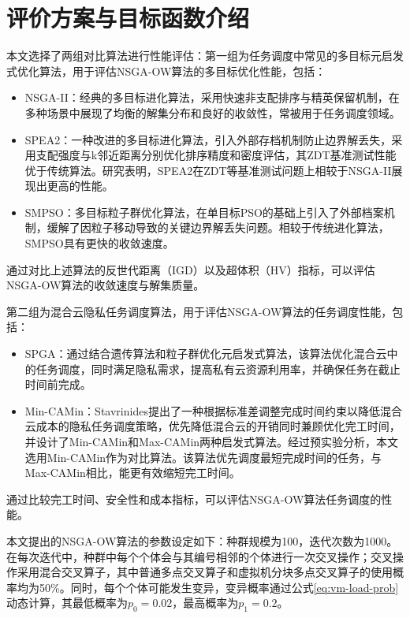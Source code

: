 \section{评价方案与目标函数介绍}

本文选择了两组对比算法进行性能评估：第一组为任务调度中常见的多目标元启发式优化算法，用于评估NSGA-OW算法的多目标优化性能，包括：
\begin{itemize}
    \item NSGA-II\cite{debFastElitistMultiobjective2002}：经典的多目标进化算法，采用快速非支配排序与精英保留机制，在多种场景中展现了均衡的解集分布和良好的收敛性，常被用于任务调度领域\cite{jafariJointOptimizationEnergy2023}。
    \item SPEA2\cite{daghayeghiDelayAwareEnergyEfficientTask2024}：一种改进的多目标进化算法，引入外部存档机制防止边界解丢失，采用支配强度与k邻近距离分别优化排序精度和密度评估，其ZDT基准测试性能优于传统算法。研究表明，SPEA2在ZDT等基准测试问题上相较于NSGA-II展现出更高的性能。
    \item SMPSO\cite{saifWorkloadAllocationEnergy2023}：多目标粒子群优化算法，在单目标PSO的基础上引入了外部档案机制，缓解了因粒子移动导致的关键边界解丢失问题。相较于传统进化算法，SMPSO具有更快的收敛速度。
\end{itemize}

通过对比上述算法的反世代距离（IGD）以及超体积（HV）指标，可以评估NSGA-OW算法的收敛速度与解集质量。

第二组为混合云隐私任务调度算法，用于评估NSGA-OW算法的任务调度性能，包括：
\begin{itemize}
    \item SPGA\cite{huangImprovedGeneticAlgorithm2023}：通过结合遗传算法和粒子群优化元启发式算法，该算法优化混合云中的任务调度，同时满足隐私需求，提高私有云资源利用率，并确保任务在截止时间前完成。
    \item Min-CAMin\cite{stavrinidesDynamicSchedulingBagsoftasks2021}：Stavrinides提出了一种根据标准差调整完成时间约束以降低混合云成本的隐私任务调度策略，优先降低混合云的开销同时兼顾优化完工时间，并设计了Min-CAMin和Max-CAMin两种启发式算法。经过预实验分析，本文选用Min-CAMin作为对比算法。该算法优先调度最短完成时间的任务，与Max-CAMin相比，能更有效缩短完工时间。
\end{itemize}

通过比较完工时间、安全性和成本指标，可以评估NSGA-OW算法任务调度的性能。

本文提出的NSGA-OW算法的参数设定如下：种群规模为100，迭代次数为1000。在每次迭代中，种群中每个个体会与其编号相邻的个体进行一次交叉操作；交叉操作采用混合交叉算子，其中普通多点交叉算子和虚拟机分块多点交叉算子的使用概率均为50\%。同时，每个个体可能发生变异，变异概率通过公式\eqref{eq:vm-load-prob}动态计算，其最低概率为\(p_0=0.02\)，最高概率为\(p_1=0.2\)。

